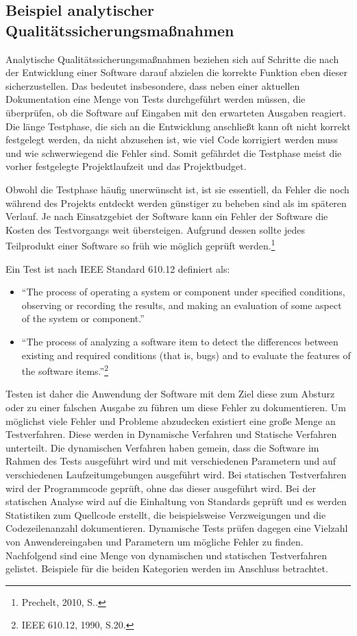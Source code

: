         \subsection{Beispiel analytischer Qualitätssicherungsmaßnahmen}
        \label{subsec:analytischeqs}

            Analytische Qualitätssicherungsmaßnahmen beziehen sich auf Schritte die nach der Entwicklung einer Software darauf abzielen die korrekte Funktion eben dieser sicherzustellen. Das bedeutet insbesondere, dass neben einer aktuellen Dokumentation eine Menge von Tests durchgeführt werden müssen, die überprüfen, ob die Software auf Eingaben mit den erwarteten Ausgaben reagiert. Die länge Testphase, die sich an die Entwicklung anschließt kann oft nicht korrekt festgelegt werden, da nicht abzusehen ist, wie viel Code korrigiert werden muss und wie schwerwiegend die Fehler sind. Somit gefährdet die Testphase meist die vorher festgelegte Projektlaufzeit und das Projektbudget.

            Obwohl die Testphase häufig unerwünscht ist, ist sie essentiell, da Fehler die noch während des Projekts entdeckt werden günstiger zu beheben sind als im späteren Verlauf. Je nach Einsatzgebiet der Software kann ein Fehler der Software die Kosten des Testvorgangs weit übersteigen.
            Aufgrund dessen sollte jedes Teilprodukt einer Software so früh wie möglich geprüft werden.\footnote{Prechelt, 2010, S..}

            Ein Test ist nach IEEE Standard 610.12 definiert als:
            \begin{itemize}
              \item \enquote{The process of operating a system or component under specified conditions, observing or recording the results, and making an evaluation of some aspect of the system or component.}
              \item \enquote{The process of analyzing a software item to detect the differences between existing and required conditions (that is, bugs) and to evaluate the features of the software items.}\footnote{IEEE 610.12, 1990, S.20.}
            \end{itemize}

            Testen ist daher die Anwendung der Software mit dem Ziel diese zum Absturz oder zu einer falschen Ausgabe zu führen um diese Fehler zu dokumentieren.
            Um möglichst viele Fehler und Probleme abzudecken existiert eine große Menge an Testverfahren. Diese werden in Dynamische Verfahren und Statische Verfahren unterteilt. Die dynamischen Verfahren haben gemein, dass die Software im Rahmen des Tests ausgeführt wird und mit verschiedenen Parametern und auf verschiedenen Laufzeitumgebungen ausgeführt wird. Bei statischen Testverfahren wird der Programmcode geprüft, ohne das dieser ausgeführt wird. Bei der statischen Analyse wird auf die Einhaltung von Standards geprüft und es werden Statistiken zum Quellcode erstellt, die beispielsweise Verzweigungen und die Codezeilenanzahl dokumentieren. Dynamische Tests prüfen dagegen eine Vielzahl von Anwendereingaben und Parametern um mögliche Fehler zu finden. Nachfolgend sind eine Menge von dynamischen und statischen Testverfahren gelistet. Beispiele für die beiden Kategorien werden im Anschluss betrachtet.

